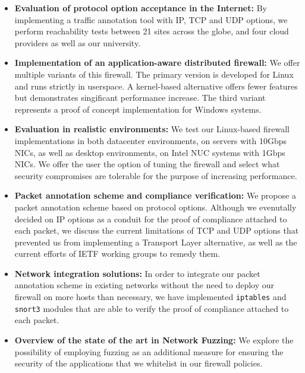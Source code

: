 \begin{itemize}
    \item \textbf{Evaluation of protocol option acceptance in the Internet:}
          By implementing a traffic annotation tool with IP, TCP and UDP options,
          we perform reachability tests between 21 sites across the globe, and
          four cloud providers as well as our university.
    \item \textbf{Implementation of an application-aware distributed firewall:}
          We offer multiple variants of this firewall. The primary version is
          developed for Linux and runs strictly in userspace. A kernel-based
          alternative offers fewer features but demonstrates singificant
          performance increase. The third variant represents a proof of concept
          implementation for Windows systems.
    \item \textbf{Evaluation in realistic environments:} We test our Linux-based
          firewall implementations in both datacenter environments, on servers
          with 10Gbps NICs, as well as desktop environments, on Intel NUC
          systems with 1Gbps NICs. We offer the user the option of tuning the
          firewall and select what security compromises are tolerable for the
          purpose of increasing performance.
    \item \textbf{Packet annotation scheme and compliance verification:} We
          propose a packet annotation scheme based on protocol options. Although
          we evenutally decided on IP options as a conduit for the proof of
          compliance attached to each packet, we discuss the current limitations
          of TCP and UDP options that prevented us from implementing a Transport
          Layer alternative, as well as the current efforts of IETF working
          groups to remedy them.
    \item \textbf{Network integration solutions:} In order to integrate our
          packet annotation scheme in existing networks without the need to
          deploy our firewall on more hosts than necessary, we have implemented
          \texttt{iptables} and \texttt{snort3} modules that are able to
          verify the proof of compliance attached to each packet.
    \item \textbf{Overview of the state of the art in Network Fuzzing:}
          We explore the possibility of employing fuzzing as an additional
          measure for ensuring the security of the applications that we
          whitelist in our firewall policies.
\end{itemize}

